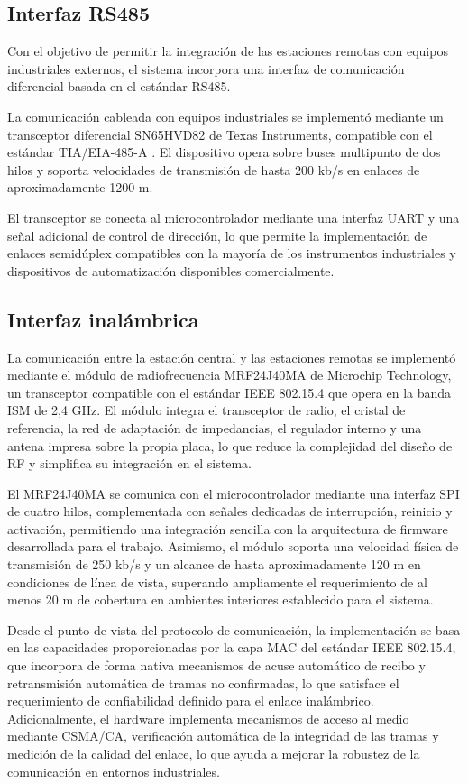 \subsection{Interfaz RS485}

Con el objetivo de permitir la integración de las estaciones remotas con equipos industriales externos, el sistema incorpora una interfaz de comunicación diferencial basada en el estándar RS485.

La comunicación cableada con equipos industriales se implementó mediante un transceptor diferencial SN65HVD82 de Texas Instruments, compatible con el estándar TIA/EIA-485-A \cite{tia_eia485a}. El dispositivo opera sobre buses multipunto de dos hilos y soporta velocidades de transmisión de hasta 200 kb/s en enlaces de aproximadamente 1200 m.

El transceptor se conecta al microcontrolador mediante una interfaz UART y una señal adicional de control de dirección, lo que permite la implementación de enlaces semidúplex compatibles con la mayoría de los instrumentos industriales y dispositivos de automatización disponibles comercialmente.

\subsection{Interfaz inalámbrica}

La comunicación entre la estación central y las estaciones remotas se implementó mediante el módulo de radiofrecuencia MRF24J40MA de Microchip Technology, un transceptor compatible con el estándar IEEE 802.15.4 \cite{ieee_standard} que opera en la banda ISM de 2,4 GHz. El módulo integra el transceptor de radio, el cristal de referencia, la red de adaptación de impedancias, el regulador interno y una antena impresa sobre la propia placa, lo que reduce la complejidad del diseño de RF y simplifica su integración en el sistema.

El MRF24J40MA se comunica con el microcontrolador mediante una interfaz SPI de cuatro hilos, complementada con señales dedicadas de interrupción, reinicio y activación, permitiendo una integración sencilla con la arquitectura de firmware desarrollada para el trabajo. Asimismo, el módulo soporta una velocidad física de transmisión de 250 kb/s y un alcance de hasta aproximadamente 120 m en condiciones de línea de vista, superando ampliamente el requerimiento de al menos 20 m de cobertura en ambientes interiores establecido para el sistema.

Desde el punto de vista del protocolo de comunicación, la implementación se basa en las capacidades proporcionadas por la capa MAC del estándar IEEE 802.15.4, que incorpora de forma nativa mecanismos de acuse automático de recibo y retransmisión automática de tramas no confirmadas, lo que satisface el requerimiento de confiabilidad definido para el enlace inalámbrico. Adicionalmente, el hardware implementa mecanismos de acceso al medio mediante CSMA/CA, verificación automática de la integridad de las tramas y medición de la calidad del enlace, lo que ayuda a mejorar la robustez de la comunicación en entornos industriales.

